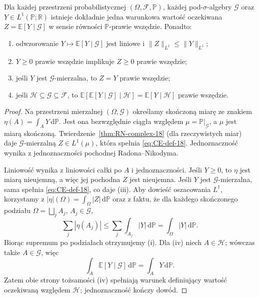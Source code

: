\begin{twierdzenie}
\label{thm:CE-existence-18}
Dla każdej przestrzeni probabilistycznej
$(\Omega,\mathcal F,\mathbb P)$, każdej
pod-$\sigma$-algebry $\mathcal G$ oraz $Y\in L^1(\mathbb P;\mathbb R)$
istnieje dokładnie jedna warunkowa wartość oczekiwana
$Z=\mathbb E[Y\mid\mathcal G]$ w sensie równości
$\mathbb P$-prawie wszędzie. Ponadto:
\begin{enumerate}[label=\textup{(\roman*)}]
\item odwzorowanie $Y\mapsto\mathbb E[Y\mid\mathcal G]$
jest liniowe i $\|Z\|_{L^1}\le\|Y\|_{L^1}$;
\item $Y\ge0$ prawie wszędzie implikuje $Z\ge0$
prawie wszędzie;
\item jeśli $Y$ jest $\mathcal G$-mierzalna,
to $Z=Y$ prawie wszędzie;
\item jeśli $\mathcal H\subseteq\mathcal G\subseteq\mathcal F$,
to $\mathbb E[\mathbb E[Y\mid\mathcal G]\mid\mathcal H]
=\mathbb E[Y\mid\mathcal H]$ prawie wszędzie.
\end{enumerate}
\end{twierdzenie}
\begin{proof}
Na przestrzeni mierzalnej $(\Omega,\mathcal G)$
określamy skończoną miarę ze znakiem
$\eta(A)=\int_A Y\,\mathrm d\mathbb P$.
Jest ona bezwzględnie ciągła względem
$\mu=\mathbb P|_{\mathcal G}$, a $\mu$ jest miarą
skończoną. Twierdzenie~\ref{thm:RN-complex-18}
(dla rzeczywistych miar) daje $\mathcal G$-mierzalną
$Z\in L^1(\mu)$, która spełnia
\eqref{eq:CE-def-18}. Jednoznaczność wynika z
jednoznaczności pochodnej Radona--Nikodyma.

Liniowość wynika z liniowości całki po $A$ i
jednoznaczności. Jeśli $Y\ge0$, to $\eta$ jest
miarą nieujemną, a więc jej pochodna $Z$ jest
nieujemna. Jeśli $Y$ jest $\mathcal G$-mierzalna,
sama spełnia \eqref{eq:CE-def-18}, co daje (iii).
Aby dowieść oszacowania $L^1$, korzystamy z
$|\eta|(\Omega)=\int_\Omega|Z|\,\mathrm d\mathbb P$
oraz z faktu, że dla każdego skończonego podziału
$\Omega=\bigsqcup_jA_j$, $A_j\in\mathcal G$,
\[
\sum_j|\eta(A_j)|
\le\sum_j\int_{A_j}|Y|\,\mathrm d\mathbb P
=\int_\Omega|Y|\,\mathrm d\mathbb P.
\]
Biorąc supremum po podziałach otrzymujemy (i).
Dla (iv) niech $A\in\mathcal H$; wówczas także
$A\in\mathcal G$, więc
\[
\int_A\mathbb E[Y\mid\mathcal G] \,\mathrm d\mathbb P
=\int_A Y\,\mathrm d\mathbb P.
\]
Zatem obie strony tożsamości (iv) spełniają
warunek definiujący wartość oczekiwaną względem
$\mathcal H$; jednoznaczność kończy dowód.
\end{proof}

